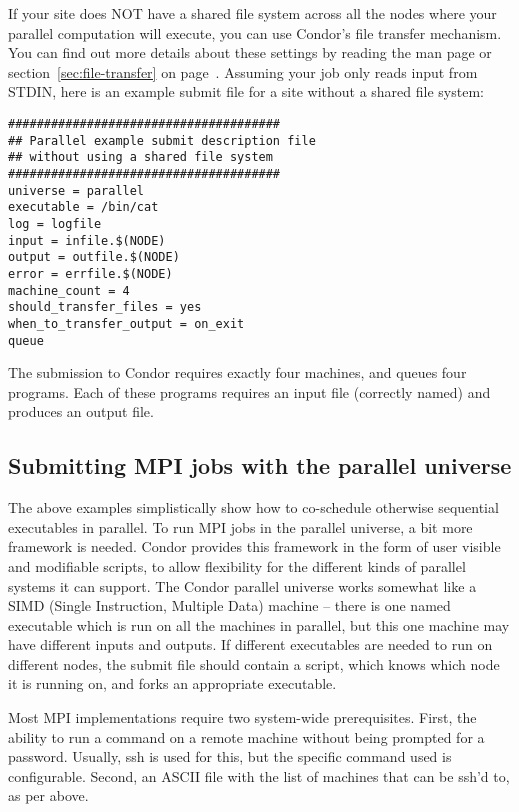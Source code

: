 If your site does NOT have a shared file system across all the nodes
where your parallel computation will execute, you can use Condor's
file transfer mechanism.  You can find out more details about these
settings by reading the  man page or
section~\ref{sec:file-transfer} on page~\pageref{sec:file-transfer}.
Assuming your job only reads input from STDIN, here is an example
submit file for a site without a shared file system:

\begin{verbatim}
######################################
## Parallel example submit description file
## without using a shared file system
######################################
universe = parallel
executable = /bin/cat
log = logfile
input = infile.$(NODE)
output = outfile.$(NODE)
error = errfile.$(NODE)
machine_count = 4
should_transfer_files = yes
when_to_transfer_output = on_exit
queue
\end{verbatim}

The submission to Condor requires exactly four machines,
and queues four programs.
Each of these programs requires an input file (correctly
named) and produces an output file.

\subsection{\label{sec:parallel-mpi-submit}Submitting MPI jobs with the parallel universe}

The above examples simplistically show how to co-schedule otherwise
sequential executables in parallel.  To run MPI jobs in the parallel
universe, a bit more framework is needed.  Condor provides this
framework in the form of user visible and modifiable scripts, to allow
flexibility for the different kinds of parallel systems it can
support.  The Condor parallel universe works somewhat like a SIMD
(Single Instruction, Multiple Data) machine -- there is one named
executable which is run on all the machines in parallel, but this one
machine may have different inputs and outputs.  If different
executables are needed to run on different nodes, the submit file
should contain a script, which knows which node it is running on, and
forks an appropriate executable.

Most MPI implementations require two system-wide prerequisites.
First, the ability to run a command on a remote machine without being
prompted for a password.  Usually, ssh is used for this, but the
specific command used is configurable.  Second, an ASCII file with the
list of machines that can be ssh'd to, as per above.

